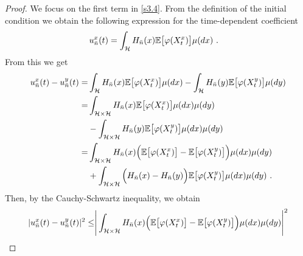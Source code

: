 \documentclass[review, onefignum, onetabnum]{siamart171218}
\begin{document}
\begin{proof}
    We focus on the first term in \eqref{s3.4}. From the definition of the
initial condition we obtain the following expression for
the time-dependent coefficient
\begin{align*}
  u_{\bar n}^x(t) &=
    \int_{\mathcal{H}} H_{\bar n}(x) \mathbb{E}\big[\varphi(X_t^x)\big] \mu(dx) \ .
\end{align*}
%
From this we get
\begin{align*}
    u_{\bar n}^x(t)-u_{\bar n}^y(t)
        =&
        \int_{\mathcal{H}} H_{\bar n}(x)
            \mathbb{E}\big[
                \varphi(X_t^x)
            \big]
            \mu(dx) -
            \int_{\mathcal{H}} H_{\bar n}(y)
            \mathbb{E}\big[
                \varphi(X_t^y)
            \big] \mu(dy)
        \\
        =&
        \int_{\mathcal{H} \times \mathcal{H}} H_{\bar n}(x)
            \mathbb{E}\big[
                \varphi(X_t^x)
            \big] \mu(dx)\mu(dy)
        \\
        &-
             \int_{\mathcal{H}\times \mathcal{H}} H_{\bar n}(y)
                \mathbb{E}\big[
                    \varphi(X_t^y)
                \big]
            \mu(dx)\mu(dy)
        \\
        =&
        \int_{\mathcal{H}\times \mathcal{H}} H_{\bar n}(x)
            \Big(
                \mathbb{E}\big[
                    \varphi(X_t^x)
                \big]
                -
                \mathbb{E}\big[
                    \varphi(X_t^y)
                \big]
            \Big)
            \mu(dx)\mu(dy)
        \\
        &+
        \int_{\mathcal{H}\times \mathcal{H}}
            \Big(
                H_{\bar n}(x) - H_{\bar n}(y)
            \Big)
            \mathbb{E}\big[
                \varphi(X_t^y)
            \big] \mu(dx) \mu(dy) \ .
\end{align*}
%
%
%
Then, by the Cauchy-Schwartz inequality, we obtain
%
%
%
\begin{equation}
    \label{s3.4.1}
    \begin{aligned}
        |u_{\bar n} ^ x(t) - u_{\bar n} ^ y(t)| ^ 2
            \le&
            \Bigg |
                \int_{\mathcal{H} \times
                \mathcal{H}} H_{\bar n}(x)
                \Big(
                    \E
                     \big[
                        \varphi(X_t^x)
                     \big]
                     -
                    \E\big[
                        \varphi(X_t^y)
                    \big]
                \Big) \mu(dx)\mu(dy)
                \Bigg|^2
            \\

\end{aligned}
\end{equation}
\end{proof}
\end{document}
